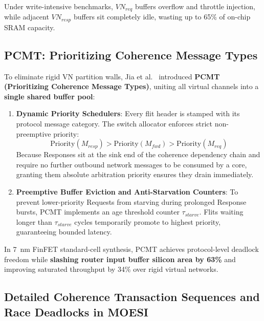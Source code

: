 Under write-intensive benchmarks, $VN_{req}$ buffers overflow and throttle injection, while adjacent $VN_{resp}$ buffers sit completely idle, wasting up to 65\% of on-chip SRAM capacity.

\subsection{PCMT: Prioritizing Coherence Message Types}
To eliminate rigid VN partition walls, Jia et al.~\cite{Jia2026} introduced \textbf{PCMT (Prioritizing Coherence Message Types)}, uniting all virtual channels into a \textbf{single shared buffer pool}:
\begin{enumerate}
    \item \textbf{Dynamic Priority Schedulers}: Every flit header is stamped with its protocol message category. The switch allocator enforces strict non-preemptive priority:
    \begin{equation}
    \text{Priority}(M_{resp}) > \text{Priority}(M_{fwd}) > \text{Priority}(M_{req})
    \label{eq:ch5_pcmt_priority}
    \end{equation}
    Because Responses sit at the sink end of the coherence dependency chain and require no further outbound network messages to be consumed by a core, granting them absolute arbitration priority ensures they drain immediately.
    \item \textbf{Preemptive Buffer Eviction and Anti-Starvation Counters}: To prevent lower-priority Requests from starving during prolonged Response bursts, PCMT implements an age threshold counter $\tau_{starve}$. Flits waiting longer than $\tau_{starve}$ cycles temporarily promote to highest priority, guaranteeing bounded latency.
\end{enumerate}
In 7~nm FinFET standard-cell synthesis, PCMT achieves protocol-level deadlock freedom while \textbf{slashing router input buffer silicon area by 63\%} and improving saturated throughput by 34\% over rigid virtual networks.

\subsection{Detailed Coherence Transaction Sequences and Race Deadlocks in MOESI}
\label{subsec:ch5_moesi_races}

